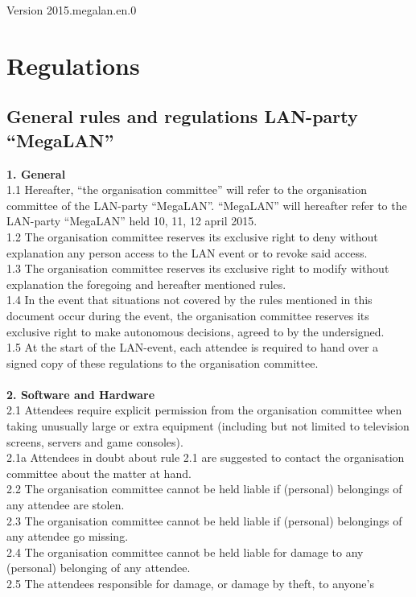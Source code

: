 \documentclass{article}
\begin{document}
Version 2015.megalan.en.0

\section{Regulations}
\subsection*{General rules and regulations LAN-party ``MegaLAN''}
\textbf{1. General}\\
1.1 Hereafter, ``the organisation committee'' will refer to the organisation 
committee of the LAN-party ``MegaLAN''. ``MegaLAN'' will 
hereafter refer to the LAN-party ``MegaLAN'' held 10, 11, 12 april 2015.\\
1.2 The organisation committee reserves its exclusive right to deny without 
explanation any person access to the LAN event or to revoke said access.\\
1.3 The organisation committee reserves its exclusive right to modify without 
explanation the foregoing and hereafter mentioned rules.\\
1.4 In the event that situations not covered by the rules mentioned in this 
document occur during the event, the organisation committee reserves its 
exclusive right to make autonomous decisions, agreed to by the undersigned. \\
1.5 At the start of the LAN-event, each attendee is required to hand over a 
signed copy of these regulations to the organisation committee.\\
\\
\textbf{2. Software and Hardware}\\
2.1 Attendees require explicit permission from the organisation committee when 
taking unusually large or extra equipment (including but not limited to 
television screens, servers and game consoles). \\
2.1a Attendees in doubt about rule 2.1 are suggested to contact the organisation 
committee about the matter at hand. \\
2.2 The organisation committee cannot be held liable if (personal) belongings of 
any attendee are stolen.\\
2.3 The organisation committee cannot be held liable if (personal) belongings of 
any attendee go missing.\\
2.4 The organisation committee cannot be held liable for damage to any 
(personal) belonging of any attendee.\\
2.5 The attendees responsible for damage, or damage by theft, to anyone’s 
\end{document}
